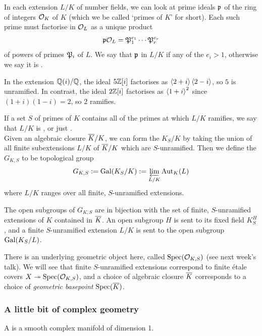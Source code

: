 In each extension $L/K$ of number fields, we can look at prime ideals $\mathfrak{p}$ of the ring of integers $\mathcal{O}_K$ of $K$ (which we be called `primes of $K$' for short). Each such prime must factorise in $\mathcal{O}_L$ as a unique product 
\[
	\mathfrak{p}\mathcal{O}_L = \mathfrak{P}_1^{e_1} \cdots \mathfrak{P}_r^{e_r}
\]
of powers of primes $\mathfrak{P}_i$ of $L$. We say that $\mathfrak{p}$  in $L/K$ if any of the $e_i > 1$, otherwise we say it is .

\begin{eg}
	In the extension $\mathbb{Q}(i)/\mathbb{Q}$, the ideal $5\mathbb{Z}[i]$ factorises as $\left\langle2+i\right\rangle\left\langle2-i\right\rangle$, so $5$ is unramified. In contrast, the ideal $2 \mathbb{Z}[i]$ factorises as $\left\langle1+i\right\rangle^2$ since $(1+i)(1-i)=2$, so $2$ ramifies. 
\end{eg}

If a set $S$ of primes of $K$ contains all of the primes at which $L/K$ ramifies, we say that $L/K$ is , or just .\\ 

Given an algebraic closure $\overline{K}/K$, we can form the  $K_S /K$ by taking the union of all finite subextensions $L/K$ of $\overline{K}/K$ which are $S$-unramified. Then we define the  $G_{K, S}$ to be topological group
\[
	G_{K, S} := \mathrm{Gal}(K_S/K) := \varprojlim_{L / K} \mathrm{Aut}_K(L)
\]
where $L/K$ ranges over all finite, $S$-unramified extensions.

\begin{thm}
	The open subgroups of $G_{K,S}$ are in bijection with the set of finite, $S$-unramified extensions of $K$ contained in $\overline{K}$. An open subgroup $H$ is sent to its fixed field $K_S^H$, and a finite $S$-unramified extension $L/K$ is sent to the open subgroup $\mathrm{Gal}(K_S/L)$.
\end{thm}

There is an underlying geometric object here, called $\mathrm{Spec}(\mathcal{O}_{K,S})$ (see next week's talk). We will see that finite $S$-unramified extensions correspond to finite \'etale covers $X \twoheadrightarrow \mathrm{Spec}(\mathcal{O}_{K,S})$, and a choice of algebraic closure $\overline{K}$ corresponds to a choice of \emph{geometric basepoint} $\mathrm{Spec}(\overline{K})$.


\subsubsection{A little bit of complex geometry}
\label{subsubsec:1_2_2_riemann_surfaces}
\begin{defn}
	A  is a smooth complex manifold of dimension 1.
\end{defn}


